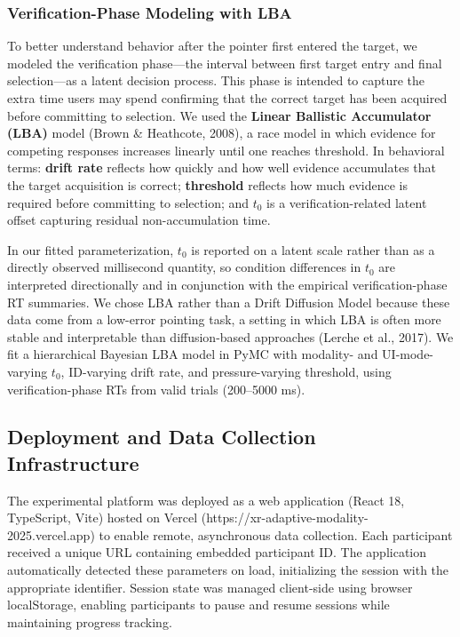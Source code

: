 \documentclass[
  11pt,
  11pt,
  letterpaper]{article}
\begin{document}
\subsubsection{Verification-Phase Modeling with
LBA}\label{verification-phase-modeling-with-lba}

To better understand behavior after the pointer first entered the
target, we modeled the verification phase---the interval between first
target entry and final selection---as a latent decision process. This
phase is intended to capture the extra time users may spend confirming
that the correct target has been acquired before committing to
selection. We used the \textbf{Linear Ballistic Accumulator (LBA)} model
(Brown \& Heathcote, 2008), a race model in which evidence for competing
responses increases linearly until one reaches threshold. In behavioral
terms: \textbf{drift rate} reflects how quickly and how well evidence
accumulates that the target acquisition is correct; \textbf{threshold}
reflects how much evidence is required before committing to selection;
and \textbf{\(t_0\)} is a verification-related latent offset capturing
residual non-accumulation time.

In our fitted parameterization, \(t_0\) is reported on a latent scale
rather than as a directly observed millisecond quantity, so condition
differences in \(t_0\) are interpreted directionally and in conjunction
with the empirical verification-phase RT summaries. We chose LBA rather
than a Drift Diffusion Model because these data come from a low-error
pointing task, a setting in which LBA is often more stable and
interpretable than diffusion-based approaches (Lerche et al., 2017). We
fit a hierarchical Bayesian LBA model in PyMC with modality- and
UI-mode-varying \(t_0\), ID-varying drift rate, and pressure-varying
threshold, using verification-phase RTs from valid trials (200--5000
ms).

\subsection{Deployment and Data Collection
Infrastructure}\label{deployment-and-data-collection-infrastructure}

The experimental platform was deployed as a web application (React 18,
TypeScript, Vite) hosted on Vercel
(https://xr-adaptive-modality-2025.vercel.app) to enable remote,
asynchronous data collection. Each participant received a unique URL
containing embedded participant ID. The application automatically
detected these parameters on load, initializing the session with the
appropriate identifier. Session state was managed client-side using
browser localStorage, enabling participants to pause and resume sessions
while maintaining progress tracking.
\end{document}
